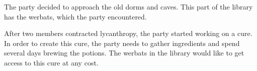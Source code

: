 The party decided to approach the old dorms and caves.
This part of the library has the werbats, which the party encountered.

After two members contracted lycanthropy, the party started working on a cure.
In order to create this cure, the party needs to gather ingredients and spend several days brewing the potions.
The werbats in the library would like to get access to this cure at any cost.
